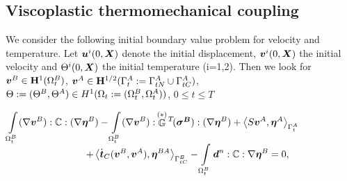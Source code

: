 \documentclass[12pt,a4paper]{scrbook}
\begin{document}
\subsection{Viscoplastic thermomechanical coupling}
We consider the following initial boundary value problem for  velocity and temperature. Let $\mbox{\boldmath$u$}^i(0,\mbox{\boldmath$X$})$ denote the initial displacement, $\mbox{\boldmath$v$}^{i}(0,\mbox{\boldmath$X$})$  the initial velocity and $\Theta^i(0,\mbox{\boldmath$X$})$ the initial temperature (i=1,2). Then we look for $\mbox{\boldmath$v$}^{B}\in\mathbf{H}^{1}(\Omega_t^{B}) $, $\mbox{\boldmath$v$}^{A} \in\mathbf{H}^{1/2}(\Gamma^{A}_t:=\Gamma^{A}_{tN}\cup\Gamma^{A}_{tC})$, $\Theta:=(\Theta^{B},\Theta^{A})\in H^{1}(\Omega_t:=(\Omega_t^{B},\Omega_t^{A}))$, $0\leq t \leq T $~

\begin{equation}\label{WeakMech}
\begin{array}{c}
\begin{array}{l}
\displaystyle\hspace{-2.0cm}\Int_{\Omega_t^{\sl}}(\nabla \bv{v}^{\sl}):\C:(\nabla \bv{\eta}^{\sl}) - \Int_{\Omega_t^{\sl}}(\nabla \bv{v}^{\sl}): \,\stackrel{(*)}{\G}\!{}^T\!(\bv{\sigma^{\sl}}):(\nabla \bv{\eta}^{\sl})+\left\langle S \bv{v}^{\ms},\bv{\eta}^{\ms}\right\rangle_{\Gamma^{\ms}_t} 
\end{array}
  \\ [2ex]
\begin{array}{r}
\displaystyle\hspace{0.5cm}+\left\langle\dot{\bv{t}}_{C} (\bv{v}^{\sl},\bv{v}^{\ms}), \bv{\eta}^{\sl \ms}\right\rangle_{\Gamma^{\sl}_{tC}}
-\Int_{\Omega_t^{\sl}} \bv{d}^n : \C : \nabla \bv{\eta}^{\sl} =0,
\end{array}
\end{array}
\end{equation}
\end{document}
